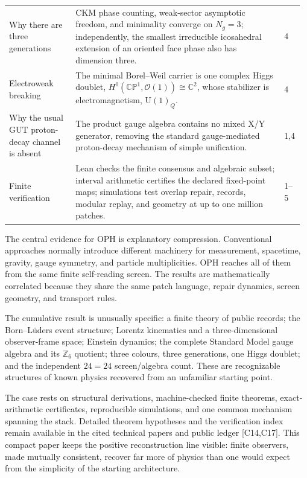\documentclass[10pt]{article}
\newcommand{\sect}[1]{\vspace{0.36em}{\large\bfseries\color{pragmaCyanText}#1}\par\vspace{-0.04em}}
\begin{document}
\begin{center}
\begin{longtable}{@{}L{0.22\linewidth}L{0.69\linewidth}L{0.06\linewidth}@{}}
Why there are three generations &
CKM phase counting, weak-sector asymptotic freedom, and minimality converge on
\(N_g=3\); independently, the smallest irreducible icosahedral extension of an
oriented face phase also has dimension three. & 4\\

Electroweak breaking &
The minimal Borel--Weil carrier is one complex Higgs doublet,
\(H^0(\mathbb{CP}^1,\mathcal O(1))\cong\mathbb C^2\), whose stabilizer is
electromagnetism, \(\mathrm U(1)_Q\). & 4\\

Why the usual GUT proton-decay channel is absent &
The product gauge algebra contains no mixed X/Y generator, removing the
standard gauge-mediated proton-decay mechanism of simple unification. & 1,4\\

Finite verification &
Lean checks the finite consensus and algebraic subset; interval arithmetic
certifies the declared fixed-point maps; simulations test overlap repair,
records, modular replay, and geometry at up to one million patches. & 1--5\\
\bottomrule
\end{longtable}
\end{center}

\sect{6. Why the combined result is exceptional}
The central evidence for OPH is explanatory compression. Conventional
approaches normally introduce different machinery for measurement, spacetime,
gravity, gauge symmetry, and particle multiplicities. OPH reaches all of them
from the same finite self-reading screen. The results are mathematically
correlated because they share the same patch language, repair dynamics,
screen geometry, and transport rules.

The cumulative result is unusually specific: a finite theory of public
records; the Born--L\"uders event structure; Lorentz kinematics and a
three-dimensional observer-frame space; Einstein dynamics; the complete
Standard Model gauge algebra and its \(\mathbb Z_6\) quotient; three colours,
three generations, one Higgs doublet; and the independent \(24=24\)
screen/algebra count. These are recognizable structures of known physics
recovered from an unfamiliar starting point.

The case rests on structural derivations, machine-checked finite theorems,
exact-arithmetic certificates, reproducible simulations, and one common
mechanism spanning the stack. Detailed theorem hypotheses and the verification
index remain available in the cited technical papers and public ledger
[C14,C17]. This compact paper keeps the positive reconstruction line visible:
finite observers, made mutually consistent, recover far more of physics than
one would expect from the simplicity of the starting architecture.
\end{document}

